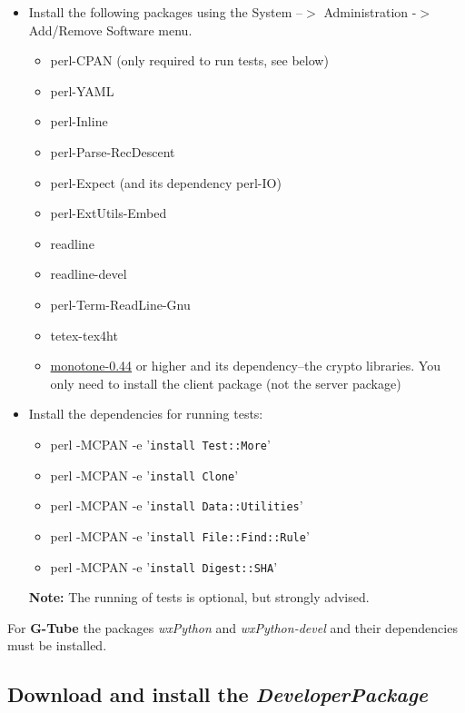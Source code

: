 \documentclass[12pt]{article}
\begin{document}
\begin{itemize}
   \item[] Install the following packages using the System --$>$ Administration -$>$ Add/Remove Software menu.
      \begin{itemize}
         \item perl-CPAN (only required to run tests, see below)
         \item perl-YAML
         \item perl-Inline
         \item perl-Parse-RecDescent
         \item perl-Expect (and its dependency perl-IO)
         \item perl-ExtUtils-Embed
         \item readline
         \item readline-devel
         \item perl-Term-ReadLine-Gnu
         \item tetex-tex4ht
         \item \href{http://monotone.ca/}{monotone-0.44} or higher and its dependency--the crypto libraries. You only need to install the client package (not the server package) 
      \end{itemize}
   \item[] Install the dependencies for running tests:
      \begin{itemize}
         \item perl -MCPAN -e '{\tt install Test::More}'
         \item perl -MCPAN -e '{\tt install Clone}'
         \item perl -MCPAN -e '{\tt install Data::Utilities}'
         \item perl -MCPAN -e '{\tt install File::Find::Rule}'
         \item perl -MCPAN -e '{\tt install Digest::SHA}' 
      \end{itemize}
      {\bf Note:} The running of tests is optional, but strongly advised.
 \end{itemize}

 For {\bf G-Tube} the packages {\it wxPython} and
 {\it wxPython-devel} and their dependencies must be installed.
 
\subsection*{Download and install the {\it DeveloperPackage}}
\end{document}

